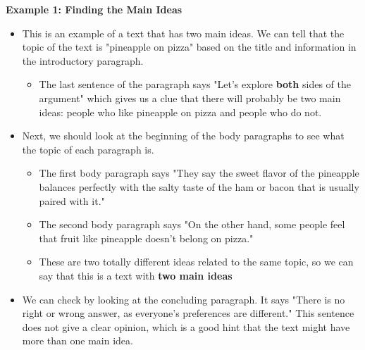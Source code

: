\documentclass[12pt]{article}
\begin{document}
\begin{tcolorbox}[colframe=black!60, colback=white, 
coltitle=black, colbacktitle=black!15, fonttitle=\bfseries\Large, 
title=Examples, halign title=center, left=10pt, right=10pt, top=10pt, bottom=15pt]

\textbf{Example 1: Finding the Main Ideas}
\begin{itemize}
    \item This is an example of a text that has two main ideas. We can tell that the topic of the text is "pineapple on pizza" based on the title and information in the introductory paragraph. 
    \begin{itemize}
        \item The last sentence of the paragraph says "Let's explore \textbf{both} sides of the argument" which gives us a clue that there will probably be two main ideas: people who like pineapple on pizza and people who do not.
    \end{itemize}
    \item Next, we should look at the beginning of the body paragraphs to see what the topic of each paragraph is.
    \begin{itemize}
        \item The first body paragraph says "They say the sweet flavor of the pineapple balances perfectly with the salty taste of the ham or bacon that is usually paired with it."
        \item The second body paragraph says "On the other hand, some people feel that fruit like pineapple doesn't belong on pizza."
        \item These are two totally different ideas related to the same topic, so we can say that this is a text with \textbf{two main ideas}
    \end{itemize}
    \item We can check by looking at the concluding paragraph. It says "There is no right or wrong answer, as everyone's preferences are different." This sentence does not give a clear opinion, which is a good hint that the text might have more than one main idea.
\end{itemize}

\end{tcolorbox}

\vspace{1em}
\end{document}
